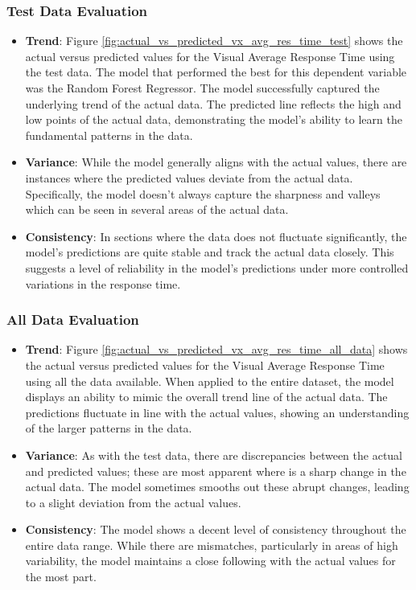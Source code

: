 \subsubsection*{Test Data Evaluation}

\begin{itemize}
    \item \textbf{Trend}: Figure \ref{fig:actual_vs_predicted_vx_avg_res_time_test} shows the actual versus predicted values for the Visual Average Response Time using the test data. 
    The model that performed the best for this dependent variable was the Random Forest Regressor. The model successfully captured the underlying trend of the actual data. The predicted line 
    reflects the high and low points of the actual data, demonstrating the model's ability to learn the fundamental patterns in the data.
    \item \textbf{Variance}: While the model generally aligns with the actual values, there are instances where the predicted values deviate from the actual data. Specifically, the model doesn't
    always capture the sharpness and valleys which can be seen in several areas of the actual data.
    \item \textbf{Consistency}: In sections where the data does not fluctuate significantly, the model's predictions are quite stable and track the actual data closely. This suggests a level
    of reliability in the model's predictions under more controlled variations in the response time.
\end{itemize}

\subsubsection*{All Data Evaluation}

\begin{itemize}
    \item \textbf{Trend}: Figure \ref{fig:actual_vs_predicted_vx_avg_res_time_all_data} shows the actual versus predicted values for the Visual Average Response Time using all the data available.
    When applied to the entire dataset, the model displays an ability to mimic the overall trend line of the actual data. The predictions fluctuate in line with the actual values, 
    showing an understanding of the larger patterns in the data.    
    \item \textbf{Variance}: As with the test data, there are discrepancies between the actual and predicted values; these are most apparent where is a sharp change in the actual data.
    The model sometimes smooths out these abrupt changes, leading to a slight deviation from the actual values.    
    \item \textbf{Consistency}: The model shows a decent level of consistency throughout the entire data range. While there are mismatches, particularly in areas of high variability,
    the model maintains a close following with the actual values for the most part.
\end{itemize}

